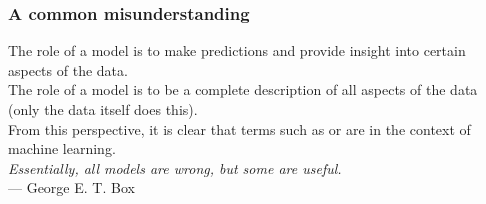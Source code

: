 \begin{frame}
\frametitle{A common misunderstanding}

The role of a model is to make predictions and provide insight into certain aspects of the data.\\[1ex]

The role of a model is  to be a complete description of all aspects of the data (only the data itself does this).\\[1ex]

From this perspective, it is clear that terms such as  or  are  in the context of machine learning.\\[2ex]

\emph{Essentially, all models are wrong, but some are useful.}\\
\hfill --- George E. T. Box
\end{frame}

  